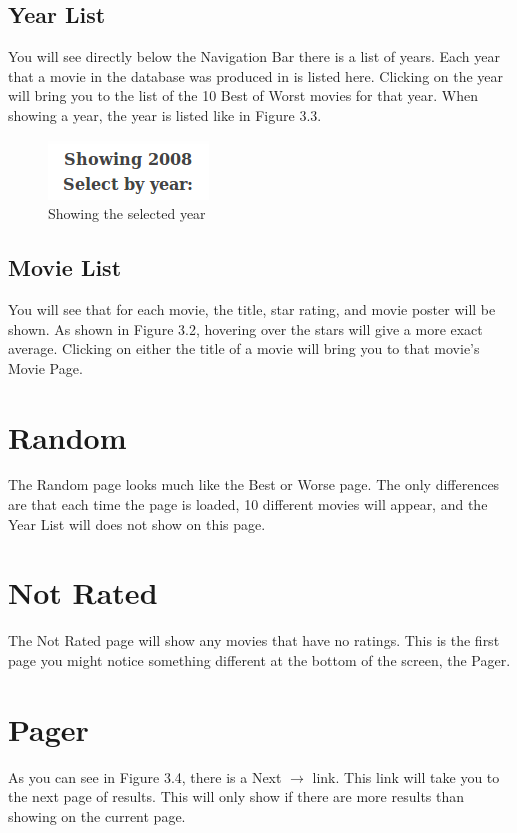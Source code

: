 \documentclass[10pt,a4paper]{scrreprt}
\begin{document}
\subsection{Year List}
You will see directly below the Navigation Bar there is a list of years. Each year that a movie in the database was produced in is listed here. Clicking on the year will bring you to the list of the 10 Best of Worst movies for that year. When showing a year, the year is listed like in Figure 3.3.

\begin{figure}[H]
\centering
\includegraphics[scale=.5]{year.png}
\caption{Showing the selected year}
\end{figure}

\subsection{Movie List}
You will see that for each movie, the title, star rating, and movie poster will be shown. As shown in Figure 3.2, hovering over the stars will give a more exact average. Clicking on either the title of a movie will bring you to that movie's Movie Page.

\section{Random}
The Random page looks much like the Best or Worse page. The only differences are that each time the page is loaded, 10 different movies will appear, and the Year List will does not show on this page.

\section{Not Rated}
The Not Rated page will show any movies that have no ratings. This is the first page you might notice something different at the bottom of the screen, the Pager.

\section{Pager}
As you can see in Figure 3.4, there is a Next $\rightarrow$ link. This link will take you to the next page of results. This will only show if there are more results than showing on the current page.
\end{document}
